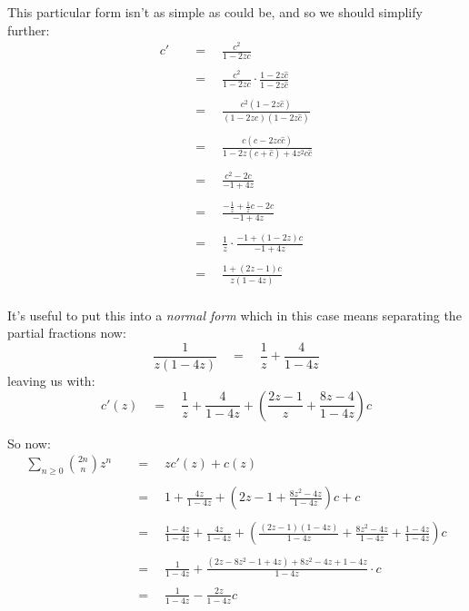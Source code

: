 \documentclass[twoside]{article}
\newcommand{\equals}{\ensuremath{\quad =\quad}}
\newcommand{\cat}{\ensuremath{c}}
\newcommand{\chat}{\ensuremath{\hat{c}}}
\begin{document}
This particular form isn't as simple as could be, and so we should simplify further:
\begin{align*}
\cat'			& \equals \frac{\cat^2}{1-2z\cat}						\\
													\\
			& \equals \frac{\cat^2}{1-2z\cat}\cdot\frac{1-2z\chat}{1-2z\chat}		\\
													\\
			& \equals \frac{\cat^2(1-2z\chat)}{(1-2z\cat)(1-2z\chat)}			\\
													\\
			& \equals \frac{\cat(\cat-2z\cat\chat)}{1-2z(\cat+\chat)+4z^2\cat\chat}		\\
													\\
			& \equals \frac{\cat^2-2\cat}{-1+4z}						\\
													\\
			& \equals \frac{-\frac{1}{z}+\frac{1}{z}\cat-2\cat}{-1+4z}			\\
													\\
			& \equals \frac{1}{z} \cdot \frac{-1+(1-2z)\cat}{-1+4z}				\\
													\\
			& \equals \frac{1+(2z-1)\cat}{z(1-4z)}						\\
\end{align*}

It's useful to put this into a \emph{normal form} which in this case means separating the partial fractions now:
$$ \frac{1}{z(1-4z)} \equals \frac{1}{z}+\frac{4}{1-4z} $$
leaving us with:
$$ \cat'(z) \equals \frac{1}{z}+\frac{4}{1-4z}+\left(\frac{2z-1}{z}+\frac{8z-4}{1-4z}\right)\cat $$

So now:
\begin{align*}
\sum_{n\ge 0}{2n \choose n}z^n	& \equals z\cat'(z)+\cat(z) 								\\
															\\
				& \equals 1+\frac{4z}{1-4z}+\left(2z-1+\frac{8z^2-4z}{1-4z}\right)\cat+\cat		\\
															\\
				& \equals \frac{1-4z}{1-4z}+\frac{4z}{1-4z}+\left(\frac{(2z-1)(1-4z)}{1-4z}
				  +\frac{8z^2-4z}{1-4z}+\frac{1-4z}{1-4z}\right)\cat					\\
															\\
				& \equals \frac{1}{1-4z}+\frac{(2z-8z^2-1+4z)+8z^2-4z+1-4z}{1-4z} \cdot \cat		\\
															\\
				& \equals \frac{1}{1-4z}-\frac{2z}{1-4z}\cat						\\
\end{align*}
\end{document}
